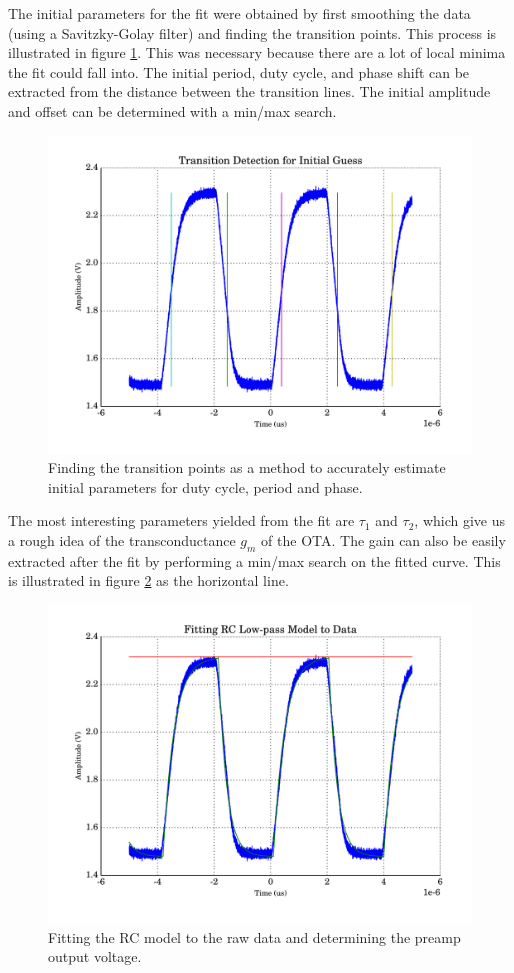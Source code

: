 The initial parameters for the  fit  were obtained by first smoothing the data
(using  a  Savitzky-Golay  filter) and finding  the  transition  points.  This
process is illustrated  in  figure  \ref{fig:transition_detection}.  This  was
necessary because there are a lot of local minima the fit could fall into. The
initial period, duty cycle, and phase shift can be extracted from the distance
between the  transition  lines.  The  initial  amplitude  and  offset  can  be
determined with a min/max search.

\begin{figure}
    \centering
    \includegraphics[width=.7\linewidth]{images/plots/transition-detection.pdf}
    \caption{Finding the transition points as a method to accurately estimate initial parameters for duty cycle, period and phase.}
    \label{fig:transition_detection}
\end{figure}

The  most  interesting  parameters  yielded  from  the fit  are  $\tau_1$  and
$\tau_2$, which give us a rough idea of the transconductance $g_m$ of the OTA.
The gain can also be easily extracted after  the  fit  by performing a min/max
search   on   the   fitted   curve.   This    is    illustrated    in   figure
\ref{fig:fitting_rc_model} as the horizontal line.

\begin{figure}
    \centering
    \includegraphics[width=.7\linewidth]{images/plots/fitting_rc_model.pdf}
    \caption{Fitting the RC model to the raw data and determining the preamp output voltage.}
    \label{fig:fitting_rc_model}
\end{figure}


